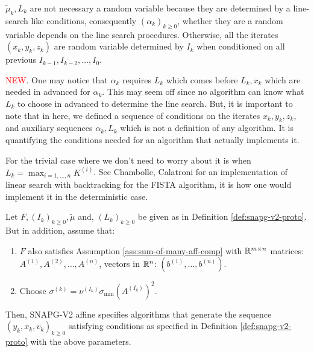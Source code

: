 \documentclass[12pt]{article}
\begin{document}
    \begin{remark}
        $\tilde \mu_k, L_k$ are not necessary a random variable because they are determined by a line-search like conditions, consequently $(\alpha_k)_{k\ge 0}$, whether they are a random variable depends on the line search procedures. 
        Otherwise, all the iterates $(x_k, y_k, z_k)$ are random variable determined by $I_k$ when conditioned on all previous $I_{k - 1}, I_{k - 2}, \ldots, I_{0}$. 
        \par
        \textcolor{red}{NEW}. One may notice that $\alpha_k$ requires $L_k$ which comes before $L_k, x_k$ which are needed in advanced for $\alpha_k$. 
        This may seem off since no algorithm can know what $L_k$ to choose in advanced to determine the line search. 
        But, it is important to note that in here, we defined a sequence of conditions on the iterates $x_k, y_k, z_k$, and auxiliary sequences $\alpha_k, L_k$ which is not a definition of any algorithm. 
        It is quantifying the conditions needed for an algorithm that actually implements it.
        \par
        For the trivial case where we don't need to worry about it is when $L_k = \max_{i = 1, \ldots, n} K^{(i)}$. 
        See Chambolle, Calatroni \cite{calatroni_backtracking_2019} for an implementation of linear search with backtracking for the FISTA algorithm, it is how one would implement it in the deterministic case. 
    \end{remark}
    \begin{definition}\label{def:snapg-v2-aff}
        Let $F, (I_k)_{k \ge 0}, \tilde \mu$ and, $(L_k)_{k \ge 0}$ be given as in Definition \ref{def:snapg-v2-proto}. 
        But in addition, assume that: 
        \begin{enumerate}[nosep]
            \item $F$ also satisfies Assumption \ref{ass:sum-of-many-aff-comp} with $\mathbb R^{m \times n}$ matrices: $A^{(1)}, A^{(2)}, \ldots, A^{(n)}$, vectors in $\mathbb R^n$: $(b^{(1)}, \ldots, b^{(n)})$. 
            \item Choose $\sigma^{(k)} = \nu^{(I_k)}\sigma_{\min}(A^{(I_k)})^2$. 
        \end{enumerate}
        Then, SNAPG-V2 affine specifies algorithms that generate the sequence $(y_k, x_k, v_k)_{k \ge 0}$ satisfying conditions as specified in Definition \ref{def:snapg-v2-proto} with the above parameters. 
    \end{definition}
\end{document}
